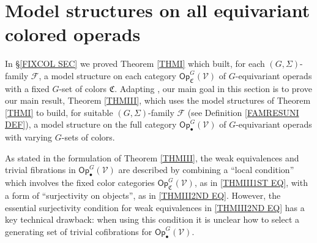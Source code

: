 \documentclass[a4paper,10pt
,draft
]{article}%
\numberwithin{equation}{section}
\numberwithin{figure}{section}
\newtheorem{corollary}[equation]{Corollary}%
\theoremstyle{definition} %
\newcommand{\vect}[1]{\text{\overrightharp{\ensuremath{#1}}}}
\DeclareMathOperator{\Aut}{Aut}%
\newcommand{\F}{\ensuremath{\mathcal F}}
\newcommand{\V}{\ensuremath{\mathcal V}}
\newcommand{\C}{\ensuremath{\mathcal C}}
\newcommand{\1}{\ensuremath{\mathbbm 1}}%
\begin{document}





















\section{Model structures on all equivariant colored operads
	}\label{MS_SEC}


\renewcommand{\C}{\mathfrak C}


In \S \ref{FIXCOL SEC} we proved Theorem \ref{THMI} which built, 
for each $(G,\Sigma)$-family $\F$,
a model structure on each category
$\mathsf{Op}_{\mathfrak{C}}^G(\V)$
of $G$-equivariant operads with a fixed $G$-set of colors $\mathfrak{C}$.
Adapting \cite{BM13,Cav,CM13b},
our main goal in this section is 
to prove our main result, Theorem \ref{THMIII},
which uses the model structures of Theorem \ref{THMI}
to build,
for suitable $(G,\Sigma)$-family $\F$ 
(see Definition \ref{FAMRESUNI DEF}),
a model structure on the full category $\mathsf{Op}^G_\bullet(\mathcal{V})$
of $G$-equivariant operads with varying $G$-sets of colors. 


As stated in the formulation of Theorem \ref{THMIII},
the weak equivalences and trivial fibrations 
in $\mathsf{Op}^G_\bullet(\V)$
are described by combining
a ``local condition'' which involves the fixed color categories $\mathsf{Op}_{\mathfrak{C}}^G(\V)$,
as in \eqref{THMIII1ST EQ},
with a form of ``surjectivity on objects'',
as in \eqref{THMIII2ND EQ}.
However, the essential surjectivity condition for 
weak equivalences in \eqref{THMIII2ND EQ}
has a key technical drawback: 
when using this condition 
it is unclear how to select a generating set of trivial cofibrations 
for $\mathsf{Op}^G_\bullet(\V)$.
\end{document}
